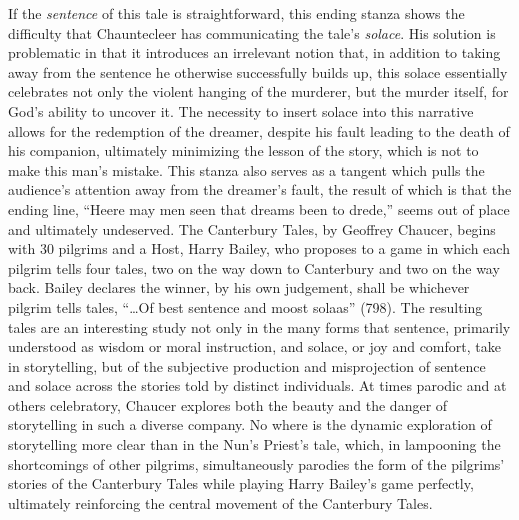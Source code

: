 \documentclass[
]{article}
\begin{document}
If the \emph{sentence} of this tale is straightforward, this ending
stanza shows the difficulty that Chauntecleer has communicating the
tale's \emph{solace}. His solution is problematic in that it introduces
an irrelevant notion that, in addition to taking away from the sentence
he otherwise successfully builds up, this solace essentially celebrates
not only the violent hanging of the murderer, but the murder itself, for
God's ability to uncover it. The necessity to insert solace into this
narrative allows for the redemption of the dreamer, despite his fault
leading to the death of his companion, ultimately minimizing the lesson
of the story, which is not to make this man's mistake. This stanza also
serves as a tangent which pulls the audience's attention away from the
dreamer's fault, the result of which is that the ending line, ``Heere
may men seen that dreams been to drede,'' seems out of place and
ultimately undeserved. The Canterbury Tales, by Geoffrey Chaucer, begins
with 30 pilgrims and a Host, Harry Bailey, who proposes to a game in
which each pilgrim tells four tales, two on the way down to Canterbury
and two on the way back. Bailey declares the winner, by his own
judgement, shall be whichever pilgrim tells tales, ``\ldots{}Of best
sentence and moost solaas'' (798). The resulting tales are an
interesting study not only in the many forms that sentence, primarily
understood as wisdom or moral instruction, and solace, or joy and
comfort, take in storytelling, but of the subjective production and
misprojection of sentence and solace across the stories told by distinct
individuals. At times parodic and at others celebratory, Chaucer
explores both the beauty and the danger of storytelling in such a
diverse company. No where is the dynamic exploration of storytelling
more clear than in the Nun's Priest's tale, which, in lampooning the
shortcomings of other pilgrims, simultaneously parodies the form of the
pilgrims' stories of the Canterbury Tales while playing Harry Bailey's
game perfectly, ultimately reinforcing the central movement of the
Canterbury Tales.
\end{document}
